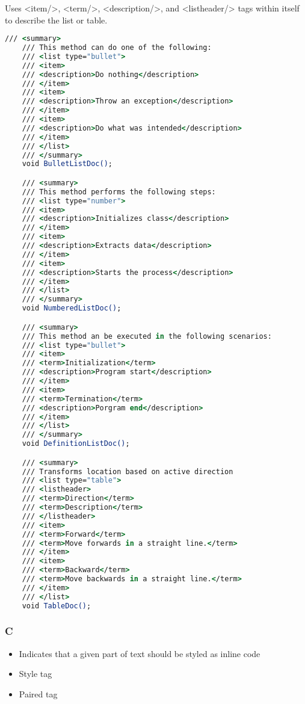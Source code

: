 Uses <item/>, <term/>, <description/>, and <listheader/> tags within itself to describe the list or table.

\begin{lstlisting}[language=csh]
    /// <summary>
    /// This method can do one of the following:
    /// <list type="bullet">
    /// <item>
    /// <description>Do nothing</description>
    /// </item>
    /// <item>
    /// <description>Throw an exception</description>
    /// </item>
    /// <item>
    /// <description>Do what was intended</description>
    /// </item>
    /// </list>
    /// </summary>
    void BulletListDoc();

    /// <summary>
    /// This method performs the following steps:
    /// <list type="number">
    /// <item>
    /// <description>Initializes class</description>
    /// </item>
    /// <item>
    /// <description>Extracts data</description>
    /// </item>
    /// <item>
    /// <description>Starts the process</description>
    /// </item>
    /// </list>
    /// </summary>
    void NumberedListDoc();

    /// <summary>
    /// This method an be executed in the following scenarios:
    /// <list type="bullet">
    /// <item>
    /// <term>Initialization</term>
    /// <description>Program start</description>
    /// </item>
    /// <item>
    /// <term>Termination</term>
    /// <description>Porgram end</description>
    /// </item>
    /// </list>
    /// </summary>
    void DefinitionListDoc();

    /// <summary>
    /// Transforms location based on active direction
    /// <list type="table">
    /// <listheader>
    /// <term>Direction</term>
    /// <term>Description</term>
    /// </listheader>
    /// <item>
    /// <term>Forward</term>
    /// <term>Move forwards in a straight line.</term>
    /// </item>
    /// <item>
    /// <term>Backward</term>
    /// <term>Move backwards in a straight line.</term>
    /// </item>
    /// </list>
    void TableDoc();
\end{lstlisting}

\subsubsection*{C}
\begin{itemize}
    \item Indicates that a given part of text should be styled as inline code
    \item Style tag
    \item Paired tag
\end{itemize}

